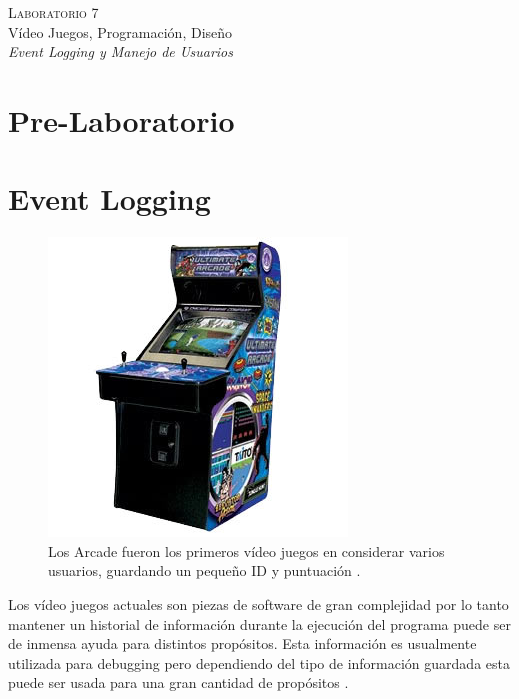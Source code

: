 \begin{center}
\textsc{\Large Laboratorio 7}~\\
{\large Vídeo Juegos, Programación, Diseño}~\\
\emph{Event Logging y Manejo de Usuarios}
\end{center}

\section{Pre-Laboratorio}

\section{Event Logging}
\setlength\intextsep{0pt}
\begin{figure}
\includegraphics[width=\linewidth]{semana7/arcade-machines.jpg}
\caption{Los Arcade fueron los primeros vídeo juegos en considerar varios usuarios, guardando un pequeño ID y puntuación \cite{arcade_score}.}
\label{fig:arcade}
\end{figure}
Los vídeo juegos actuales son piezas de software de gran complejidad por lo tanto mantener un historial de información durante la ejecución del programa puede ser de inmensa ayuda para distintos propósitos. Esta información es usualmente utilizada para debugging pero dependiendo del tipo de información guardada esta puede ser usada para una gran cantidad de propósitos \cite{colm_tracing}.

